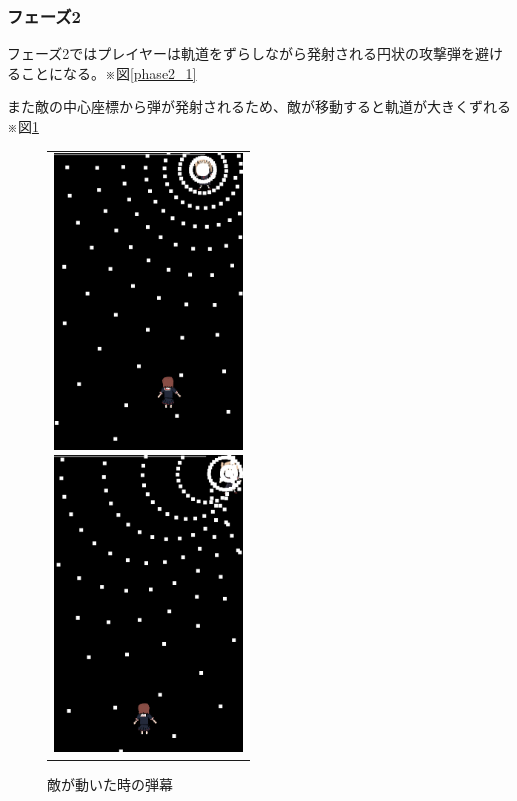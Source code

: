 \documentclass[a4paper,titlepage,11pt]{ltjsarticle}
\begin{document}
\subsubsection{フェーズ2}
フェーズ2ではプレイヤーは軌道をずらしながら発射される円状の攻撃弾を避けることになる。※図\ref{phase2_1}

また敵の中心座標から弾が発射されるため、敵が移動すると軌道が大きくずれる※図\ref{phase2_2}
\begin{figure}[H]
\begin{center}
\begin{tabular}{c}
\begin{minipage}{0.5\hsize}
\begin{center}
\includegraphics[width=5cm]{phase2_1.png}
\end{center}
\caption{通常時の弾幕}
\label{phase2_1}
\end{minipage}
\begin{minipage}{0.5\hsize}
\begin{center}
\includegraphics[width=5cm]{phase2_2.png}
\end{center}
\caption{敵が動いた時の弾幕}
\label{phase2_2}
\end{minipage}
\end{tabular}
\end{center}
\end{figure}
\end{document}
